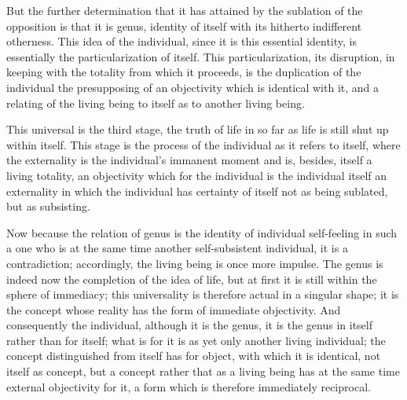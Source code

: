 But the further determination
that it has attained by
the sublation of the opposition is
that it is genus,
identity of itself with its
hitherto indifferent otherness.
This idea of the individual,
since it is this essential identity,
is essentially the particularization of itself.
This particularization, its disruption,
in keeping with the totality from which it proceeds,
is the duplication of the individual
the presupposing of an objectivity
which is identical with it,
and a relating of the living being to itself
as to another living being.

This universal is the third stage,
the truth of life in so far as
life is still shut up within itself.
This stage is the process of
the individual as it refers to itself,
where the externality is
the individual's immanent moment
and is, besides, itself a living totality,
an objectivity which for the individual
is the individual itself
an externality in which the individual has
certainty of itself not as being sublated,
but as subsisting.

Now because the relation of genus is
the identity of individual self-feeling
in such a one who is at the same time
another self-subsistent individual,
it is a contradiction;
accordingly, the living being is once more impulse.
The genus is indeed now the completion of the idea of life,
but at first it is still within the sphere of immediacy;
this universality is therefore actual in a singular shape;
it is the concept whose reality has
the form of immediate objectivity.
And consequently the individual, although it is the genus,
it is the genus in itself rather than for itself;
what is for it is as yet only another living individual;
the concept distinguished from itself has for object,
with which it is identical, not itself as concept,
but a concept rather that as a living being has
at the same time external objectivity for it,
a form which is therefore immediately reciprocal.

